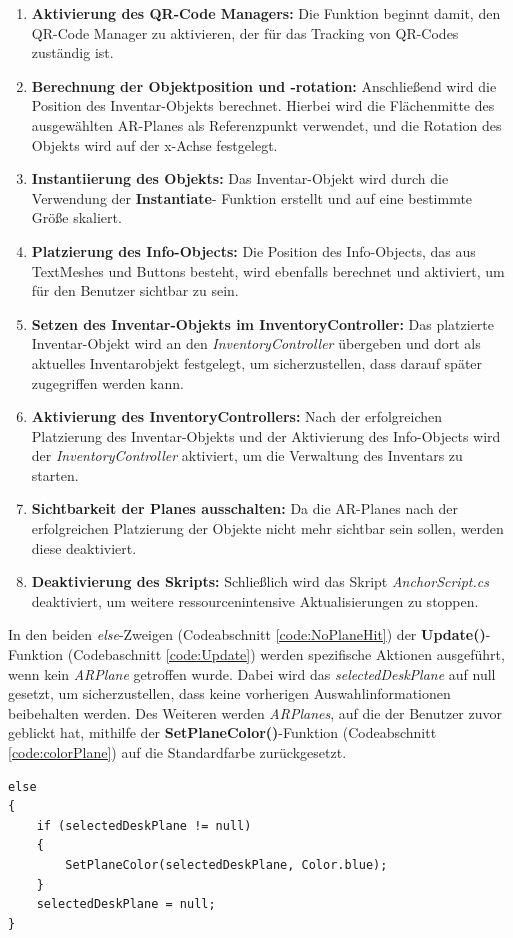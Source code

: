 \begin{enumerate}
    \item \textbf{Aktivierung des QR-Code Managers:} Die Funktion beginnt damit, den QR-Code Manager zu aktivieren, der
    für das Tracking von QR-Codes zuständig ist.
    \item \textbf{Berechnung der Objektposition und -rotation:} Anschließend wird die Position des Inventar-Objekts
    berechnet. Hierbei wird die Flächenmitte des ausgewählten AR-Planes als Referenzpunkt verwendet, und die Rotation des
    Objekts wird auf der x-Achse festgelegt.
    \item \textbf{Instantiierung des Objekts:} Das Inventar-Objekt wird durch die Verwendung der \textbf{Instantiate}-
    Funktion erstellt und auf eine bestimmte Größe skaliert.
    \item \textbf{Platzierung des Info-Objects:} Die Position des Info-Objects, das aus TextMeshes und Buttons besteht,
    wird ebenfalls berechnet und aktiviert, um für den Benutzer sichtbar zu sein.
    \item \textbf{Setzen des Inventar-Objekts im InventoryController:} Das platzierte Inventar-Objekt wird an den \textit{InventoryController}
    übergeben und dort als aktuelles Inventarobjekt festgelegt, um sicherzustellen, dass darauf später zugegriffen werden
    kann.
    \item \textbf{Aktivierung des InventoryControllers:} Nach der erfolgreichen Platzierung des Inventar-Objekts und der
    Aktivierung des Info-Objects wird der \textit{InventoryController} aktiviert, um die Verwaltung des Inventars zu starten.
    \item \textbf{Sichtbarkeit der Planes ausschalten:} Da die AR-Planes nach der erfolgreichen Platzierung der Objekte
    nicht mehr sichtbar sein sollen, werden diese deaktiviert.
    \item \textbf{Deaktivierung des Skripts:} Schließlich wird das Skript \textit{AnchorScript.cs} deaktiviert, um weitere
    ressourcenintensive Aktualisierungen zu stoppen.\\
\end{enumerate}

In den beiden \textit{else}-Zweigen (Codeabschnitt \ref{code:NoPlaneHit}) der \textbf{Update()}-Funktion (Codebaschnitt \ref{code:Update})
werden spezifische Aktionen ausgeführt, wenn kein \textit{ARPlane} getroffen wurde. Dabei wird das \textit{selectedDeskPlane}
auf null gesetzt, um sicherzustellen, dass keine vorherigen Auswahlinformationen beibehalten werden. Des Weiteren werden
\textit{ARPlanes}, auf die der Benutzer zuvor geblickt hat, mithilfe der \textbf{SetPlaneColor()}-Funktion (Codeabschnitt \ref{code:colorPlane})
auf die Standardfarbe zurückgesetzt.
\begin{lstlisting}[style=csharp, caption={Ausgewaehltes Plane und Farbe zuruecksetzen}, label=code:NoPlaneHit]
else
{
    if (selectedDeskPlane != null)
    {
        SetPlaneColor(selectedDeskPlane, Color.blue);
    }
    selectedDeskPlane = null;
}
\end{lstlisting}\\


